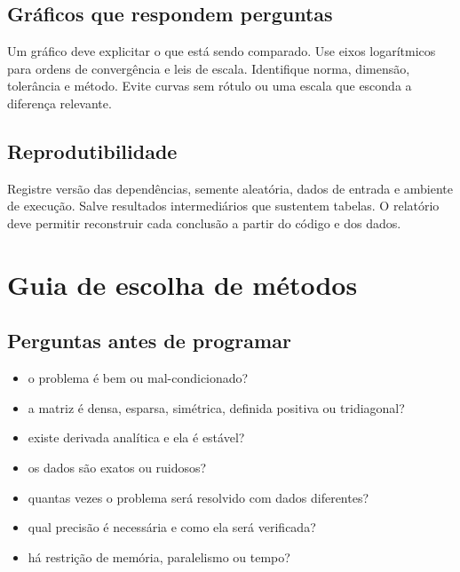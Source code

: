 \documentclass[12pt,a4paper,openany]{book}
\begin{document}
\section{Gráficos que respondem perguntas}



Um gráfico deve explicitar o que está sendo comparado. Use eixos logarítmicos para ordens de convergência e leis de escala. Identifique norma, dimensão, tolerância e método. Evite curvas sem rótulo ou uma escala que esconda a diferença relevante.



\section{Reprodutibilidade}



Registre versão das dependências, semente aleatória, dados de entrada e ambiente de execução. Salve resultados intermediários que sustentem tabelas. O relatório deve permitir reconstruir cada conclusão a partir do código e dos dados.



\chapter{Guia de escolha de métodos}



\section{Perguntas antes de programar}



\begin{itemize}
\item o problema é bem ou mal-condicionado?
\item a matriz é densa, esparsa, simétrica, definida positiva ou tridiagonal?
\item existe derivada analítica e ela é estável?
\item os dados são exatos ou ruidosos?
\item quantas vezes o problema será resolvido com dados diferentes?
\item qual precisão é necessária e como ela será verificada?
\item há restrição de memória, paralelismo ou tempo?
\end{itemize}
\end{document}
